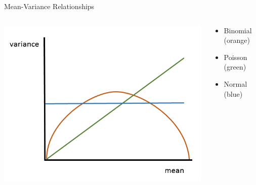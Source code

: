 \documentclass{beamer}
\begin{document}
\begin{frame}{Mean-Variance Relationships}
    \begin{columns}
        \begin{column}{0.5\textwidth}
            \includegraphics[width=\textwidth]{lectures/day_10_GLMMs/figures/mean-variance.png}
        \end{column}
        \begin{column}{0.5\textwidth}
        \large
            \begin{itemize}
                \item Binomial (orange)
                \item Poisson  (green)
                \item Normal   (blue)
            \end{itemize}
        \end{column}
    \end{columns}
\end{frame}
\end{document}
